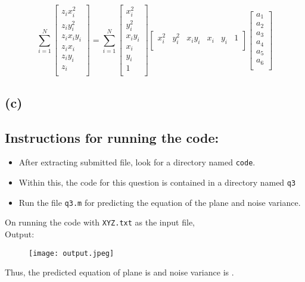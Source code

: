 \documentclass[11pt, fleqn]{article}
\begin{document}
\begin{equation}
    \sum_{i=1}^{N}
    \begin{bmatrix}
        z_i x_i^2 \\
        z_i y_i^2 \\
        z_i x_i y_i \\
        z_i x_i \\
        z_i y_i \\
        z_i \\
    \end{bmatrix}
    =
    \sum_{i=1}^{N}
    \begin{bmatrix}
        x_i^2 \\
        y_i^2 \\
        x_i y_i \\
        x_i \\
        y_i \\
        1 \\
    \end{bmatrix}
    \begin{bmatrix}
        x_i^2 & y_i^2 & x_i y_i & x_i & y_i & 1 \\
    \end{bmatrix}
    \begin{bmatrix}
        a_1 \\
        a_2 \\
        a_3 \\
        a_4 \\
        a_5 \\
        a_6 \\
    \end{bmatrix}
\end{equation}

\subsection*{(c)}
\subsection*{Instructions for running the code:}
\begin{itemize}
    \item After extracting submitted file, look for a directory named \texttt{code}.
    \item Within this, the code for this question is contained in a directory named \texttt{q3}
    \item Run the file \texttt{q3.m} for predicting the equation of the plane and noise variance.
\end{itemize}
On running the code with \texttt{XYZ.txt} as the input file, \\
Output:
\begin{figure}[H]
    \vspace{-1em}
    \texttt{[image: output.jpeg]}
\end{figure}
\vspace{-1em}
Thus, the predicted equation of plane is  and noise variance is .
\end{document}
